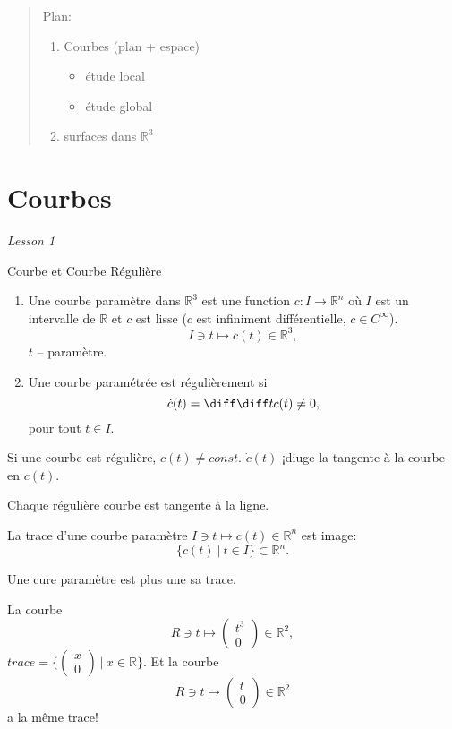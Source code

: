 \tableofcontents

\begin{abstract}
Plan:
\begin{enumerate}
\item Courbes (plan + espace)
\begin{itemize}
\item étude local
\item étude global
\end{itemize}
\item surfaces dans $\mathbb{R}^3$
\end{enumerate}\end{abstract}
 
\section{Courbes}

\emph{Lesson 1}

\theoremstyle{definition}
\begin{definition}{Courbe et Courbe Régulière}
\begin{enumerate}
\item Une courbe paramètre dans $\mathbb{R}^3$ est une function $c:I\rightarrow \mathbb{R}^n$ où $I$ est un intervalle de $\mathbb{R}$ et $c$ est lisse ($c$ est infiniment différentielle, $ c \in C^\infty$).
$$I\ni t\mapsto c(t)\in \mathbb{R}^3,$$
$t$ -- paramètre.
\item Une courbe paramétrée est régulièrement si
$$\dot{c}(t) = \frak{\diff}{\diff t}c(t)\neq 0,$$
pour tout $t\in I$.
\end{enumerate}
\end{definition}

Si une courbe est régulière, $c(t)\neq const$. $\dot{c}(t)$ ¡diuge la tangente à la courbe en $c(t)$.

Chaque régulière courbe est tangente à la ligne.

\begin{definition} La trace d'une courbe paramètre $I\ni t \mapsto c(t)\in \mathbb{R}^n$ est image:
$$\{c(t)\ |\ t\in I\} \subset \mathbb{R}^n.$$
\end{definition}

Une cure paramètre est plus une sa trace.

La courbe $$R\ni t \mapsto \left( \begin{array}{c} t^3 \\ 0 \end{array} \right) \in \mathbb{R}^2,$$ 
$trace = \{ \left( \begin{array}{c} x \\ 0 \end{array} \right)\ |\ x\in \mathbb{R} \}$. Et la courbe $$R\ni t \mapsto \left( \begin{array}{c} t \\ 0 \end{array} \right) \in \mathbb{R}^2$$ a la même trace!

